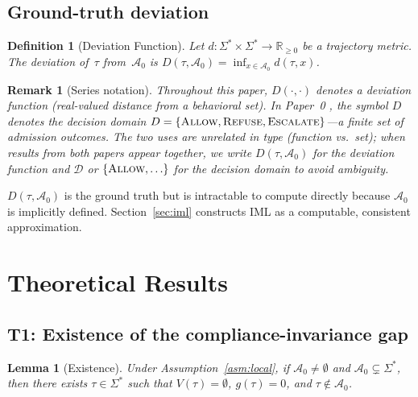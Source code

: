 \documentclass[11pt]{article}
\newtheorem{lemma}[theorem]{Lemma}
\newtheorem{definition}{Definition}[section]
\newtheorem{remark}{Remark}[section]
\newcommand{\Sigstar}{\Sigma^{*}}
\newcommand{\Azero}{\mathcal{A}_0}
\begin{document}
\subsection{Ground-truth deviation}

\begin{definition}[Deviation Function]
\label{def:deviation}
Let $d : \Sigstar \times \Sigstar \to \mathbb{R}_{\geq 0}$ be a trajectory
metric.  The \emph{deviation} of~$\tau$ from~$\Azero$ is
$D(\tau, \Azero) = \inf_{x \in \Azero} d(\tau, x)$.
\end{definition}

\begin{remark}[Series notation]
\label{rem:notation-D}
Throughout this paper, $D(\cdot,\cdot)$ denotes a \emph{deviation function}
(real-valued distance from a behavioral set).  In Paper~0
\citep{fernandez2026a}, the symbol $D$ denotes the \emph{decision domain}
$D = \{\textsc{Allow}, \textsc{Refuse}, \textsc{Escalate}\}$---a finite set
of admission outcomes.  The two uses are unrelated in type (function vs.\
set); when results from both papers appear together, we write
$D(\tau,\Azero)$ for the deviation function and $\mathcal{D}$ or
$\{\textsc{Allow},\ldots\}$ for the decision domain to avoid ambiguity.
\end{remark}

$D(\tau,\Azero)$ is the ground truth but is intractable to compute directly
because $\Azero$ is implicitly defined.  Section~\ref{sec:iml} constructs IML
as a computable, consistent approximation.

\section{Theoretical Results}
\label{sec:theory}

\subsection{T1: Existence of the compliance-invariance gap}

\begin{lemma}[Existence]
\label{lem:existence}
Under Assumption~\ref{asm:local}, if $\Azero \neq \emptyset$ and
$\Azero \subsetneq \Sigstar$, then there exists $\tau \in \Sigstar$ such
that $V(\tau) = \emptyset$, $g(\tau) = 0$, and $\tau \notin \Azero$.
\end{lemma}
\end{document}
